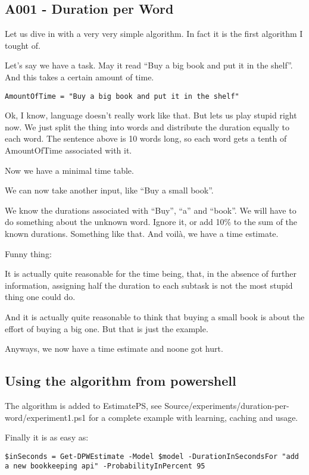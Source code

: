 \newpage{}

\subsection{A001 - Duration per Word}

Let us dive in with a very very simple algorithm. In fact it is the
first algorithm I tought of.

Let's say we have a task. May it read ``Buy a big book and put it in the
shelf''. And this takes a certain amount of time.

\begin{verbatim}
AmountOfTime = "Buy a big book and put it in the shelf"
\end{verbatim}

Ok, I know, language doesn't really work like that. But lets us play
stupid right now. We just split the thing into words and distribute the
duration equally to each word. The sentence above is 10 words long, so
each word gets a tenth of AmountOfTime associated with it.

Now we have a minimal time table.

We can now take another input, like ``Buy a small book''.

We know the durations associated with ``Buy'', ``a'' and ``book''. We
will have to do something about the unknown word. Ignore it, or add 10\%
to the sum of the known durations. Something like that. And voilà, we
have a time estimate.

Funny thing:

It is actually quite reasonable for the time being, that, in the absence
of further information, assigning half the duration to each subtask is
not the most stupid thing one could do.

And it is actually quite reasonable to think that buying a small book is
about the effort of buying a big one. But that is just the example.

Anyways, we now have a time estimate and noone got hurt.

\hypertarget{using-the-algorithm-from-powershell}{%
\subsection{Using the algorithm from powershell}}

The algorithm is added to EstimatePS, see
Source/experiments/duration-per-word/experiment1.ps1 for a complete
example with learning, caching and usage.

Finally it is as easy as:

\begin{verbatim}
$inSeconds = Get-DPWEstimate -Model $model -DurationInSecondsFor "add a new bookkeeping api" -ProbabilityInPercent 95
\end{verbatim}

